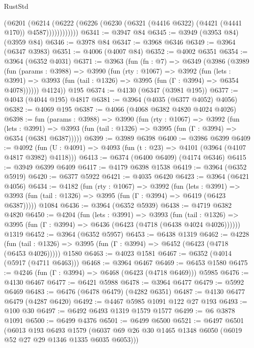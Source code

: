 \begin{lexlean}{RustStd}
\begin{coremodule}
{\begin{coremodule}
{{{{{{{{{{{{{{{{{{{{{{{{{{{{{{{{{{{{{{                (@6201
                  (@6214
                    (@6222 (@6226 (@6230 (@6321 (@4416 @6322) (@4421 (@4441 @170)) @4587))))))))))))
@6341 := @3947 @84
@6345 := @3949 (@3953 @84) (@3959 @84)
@6346 := @3978 @84
@6347 := @3968 @6346
@6349 := @3964 (@6347 @3983)
@6351 := @4006 (@4007 @84)
@6352 := @4002 @6351
@6354 := @3964 (@6352 @4031)
@6371 := @3963
    (fun (fn : @7) =>
    @6349
      (@3986
        (@3989
          (fun (params : @3988) =>
          @3990
            (fun (rty : @1067) =>
            @3992
              (fun (lets : @3991) =>
              @3993 (fun (tail : @1326) => @3995 (fun (Γ : @3994) => @6354 @4078))))))
        @4124))
    @195
@6374 := @4130 (@6347 (@3981 @195))
@6377 := @4043 (@4044 @195) @4817
@6381 := @3964 (@4035 (@6377 @4052) @4056)
@6382 := @4069 @195
@6387 := @4066 (@4068 @6382 @4820 @4024 @4026)
@6398 := fun (params : @3988) =>
  @3990
    (fun (rty : @1067) =>
    @3992
      (fun (lets : @3991) =>
      @3993 (fun (tail : @1326) => @3995 (fun (Γ : @3994) => @6354 (@6381 @6387)))))
@6399 := @3989 @6398
@6400 := @3986 @6399
@6409 := @4092 (fun (U : @4091) => @4093 (fun (t : @23) => @4101 (@3964 (@4107 @4817 @3982) @4118)))
@6413 := @6374 (@6400 @6409) (@4174 @6346)
@6415 := @3949 @6399 @6409
@6417 := @4179 @6398 @1538
@6419 := @3964 (@6352 @5919)
@6420 := @6377 @5922
@6421 := @4035 @6420
@6423 := @3964 (@6421 @4056)
@6434 := @4182
    (fun (rty : @1067) =>
    @3992
      (fun (lets : @3991) =>
      @3993 (fun (tail : @1326) => @3995 (fun (Γ : @3994) => @6419 (@6423 @6387)))))
    @1084
@6436 := @3964 (@6352 @5939)
@6438 := @4719 @6382 @4820
@6450 := @4204
    (fun (lets : @3991) =>
    @3993
      (fun (tail : @1326) => @3995 (fun (Γ : @3994) => @6436 (@6423 (@4718 (@6438 @4024 @4026))))))
    @1319
@6452 := @3964 (@6352 @5957)
@6453 := @6438 @1319
@6462 := @4228
    (fun (tail : @1326) => @3995 (fun (Γ : @3994) => @6452 (@6423 (@4718 (@6453 @4026)))))
    @1580
@6463 := @4023 @1581
@6467 := @6352 (@4014 (@5917 (@4711 @6463)))
@6468 := @3964 @6467
@6469 := @6453 @1580
@6475 := @4246 (fun (Γ : @3994) => @6468 (@6423 (@4718 @6469))) @5985
@6476 := @4130 @6467
@6477 := @6421 @5988
@6478 := @3964 @6477
@6479 := @5992 @6469
@6483 := @6476 (@6478 @6479) (@4282 @6351)
@6487 := @4130 @6477 @6479 (@4287 @6420)
@6492 := @4467 @5985 @1091 @122 @27 @193
@6493 := @100 @30
@6497 := @6492 @6493 @1319 @1579 @1577
@6499 := @6 @3878 @1091
@6500 := @6499 @4376
@6501 := @6499 @6500
@6521 := @6497
    @6501
    (@6013
      @193
      @6493
      @1579
      (@6037 @69 @26 @30 @1465 @1348 @6050 (@6019 @52 @27 @29 @1346 @1335 @6035 @6053)))
}}}}}}}}}}}}}}}}}}}}}}}}}}}}}}}}}}}}}}
\end{coremodule}}
\end{coremodule}
\end{lexlean}
